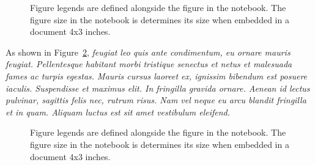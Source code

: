 \documentclass[
  a4paper,
]{scrbook}
\let\oldemph\emph
\renewcommand\emph[1]{\oldemph{\color{gray}#1}}
\begin{document}
\begin{figure}[H]


\caption{\label{fig-danish-interaction}Figure legends are defined
alongside the figure in the notebook. The figure size in the notebook is
determines its size when embedded in a document 4x3 inches.}

\end{figure}%

As shown in Figure~\ref{fig-meaninformality}, \emph{feugiat leo quis
ante condimentum, eu ornare mauris feugiat. Pellentesque habitant morbi
tristique senectus et netus et malesuada fames ac turpis egestas. Mauris
cursus laoreet ex, ignissim bibendum est posuere iaculis. Suspendisse et
maximus elit. In fringilla gravida ornare. Aenean id lectus pulvinar,
sagittis felis nec, rutrum risus. Nam vel neque eu arcu blandit
fringilla et in quam. Aliquam luctus est sit amet vestibulum eleifend.}

\begin{figure}[H]


\caption{\label{fig-meaninformality}Figure legends are defined alongside
the figure in the notebook. The figure size in the notebook is
determines its size when embedded in a document 4x3 inches.}

\end{figure}%
\end{document}
